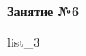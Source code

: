 \documentclass[12pt, a4paper]{article}
\begin{document}
	\begin{center}
		\large
		\textbf{Занятие №6}
	\end{center}
	{list_3}
\end{document}
